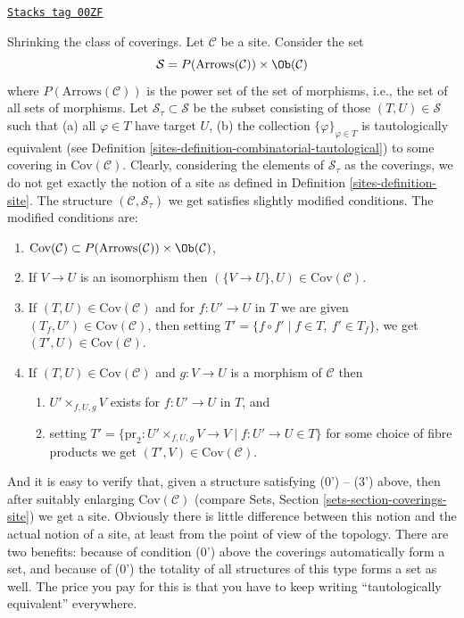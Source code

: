 \begin{remark}
\label{sites-remark-shrink-coverings}
\href{https://stacks.math.columbia.edu/tag/00ZF}{\texttt{Stacks tag 00ZF}}

Shrinking the class of coverings. Let $\mathcal{C}$ be a site.
Consider the set
$$
\mathcal{S} = P(\text{Arrows}(\mathcal{C})) \times \Ob(\mathcal{C})
$$
where $P(\text{Arrows}(\mathcal{C}))$ is the power set of the set of morphisms,
i.e., the set of all sets of morphisms.
Let $\mathcal{S}_\tau \subset \mathcal{S}$
be the subset consisting of those $(T, U) \in \mathcal{S}$ such that
(a) all $\varphi \in T$ have target $U$,
(b) the collection $\{\varphi\}_{\varphi \in T}$ is tautologically
equivalent (see Definition \ref{sites-definition-combinatorial-tautological})
to some covering in $\text{Cov}(\mathcal{C})$.
Clearly, considering the elements of $\mathcal{S}_\tau$ as
the coverings, we do not get exactly the notion of a site
as defined in Definition \ref{sites-definition-site}.
The structure $(\mathcal{C}, \mathcal{S}_\tau)$
we get satisfies slightly modified conditions. The modified
conditions are:
\begin{enumerate}
\item[(0')] $\text{Cov}(\mathcal{C}) \subset
P(\text{Arrows}(\mathcal{C})) \times \Ob(\mathcal{C})$,
\item[(1')] If $V \to U$ is an isomorphism then
$(\{V \to U\}, U) \in \text{Cov}(\mathcal{C})$.
\item[(2')] If $(T, U) \in \text{Cov}(\mathcal{C})$
and for $f : U' \to U$ in $T$ we are given
$(T_f, U') \in \text{Cov}(\mathcal{C})$,
then setting $T' = \{f \circ f' \mid f \in T,\ f' \in T_f\}$,
we get $(T', U) \in \text{Cov}(\mathcal{C})$.
\item[(3')] If $(T, U) \in \text{Cov}(\mathcal{C})$ and $g : V \to U$
is a morphism of $\mathcal{C}$ then
\begin{enumerate}
\item $U' \times_{f, U, g} V$ exists for $f : U' \to U$ in $T$, and
\item setting
$T' = \{\text{pr}_2 : U' \times_{f, U, g} V \to V \mid f : U' \to U \in T\}$
for some choice of fibre products we get $(T', V) \in \text{Cov}(\mathcal{C})$.
\end{enumerate}
\end{enumerate}
And it is easy to verify that, given a structure satisfying
(0') -- (3') above, then after suitably enlarging
$\text{Cov}(\mathcal{C})$ (compare Sets,
Section \ref{sets-section-coverings-site}) we get a site.
Obviously there is little difference between this notion and the
actual notion of a site, at least from the point of view of the
topology. There are two benefits:
because of condition (0') above the coverings automatically
form a set, and because of (0') the totality of all structures
of this type forms a set as well.
The price you pay for this is that you have to keep writing
``tautologically equivalent'' everywhere.
\end{remark}

